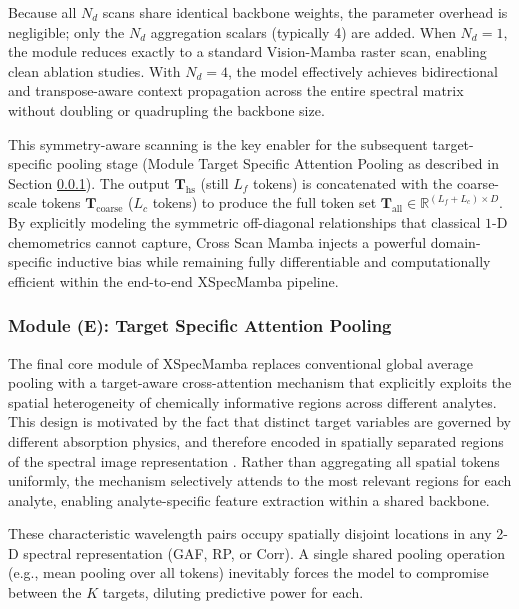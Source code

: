 \documentclass[pdflatex,sn-mathphys-num]{sn-jnl}%
\begin{document}
Because all $N_d$ scans share identical backbone weights, the parameter overhead is negligible; only the $N_d$ aggregation scalars (typically 4) are added. When $N_d = 1$, the module reduces exactly to a standard Vision-Mamba raster scan, enabling clean ablation studies. With $N_d = 4$, the model effectively achieves bidirectional and transpose-aware context propagation across the entire spectral matrix without doubling or quadrupling the backbone size.

This symmetry-aware scanning is the key enabler for the subsequent target-specific pooling stage (Module Target Specific Attention Pooling as described in Section \ref{sec:target-specific-attention-pooling}). The output $\mathbf{T}_\text{hs}$ (still $L_f$ tokens) is concatenated with the coarse-scale tokens $\mathbf{T}_\text{coarse}$ ($L_c$ tokens) to produce the full token set $\mathbf{T}_\text{all} \in \mathbb{R}^{(L_f + L_c) \times D}$. By explicitly modeling the symmetric off-diagonal relationships that classical $1$-D chemometrics cannot capture, Cross Scan Mamba injects a powerful domain-specific inductive bias while remaining fully differentiable and computationally efficient within the end-to-end XSpecMamba pipeline.

\subsubsection{Module (E): Target Specific Attention Pooling}\label{sec:target-specific-attention-pooling}
The final core module of XSpecMamba replaces conventional global average pooling with a target-aware cross-attention mechanism that explicitly exploits the spatial heterogeneity of chemically informative regions across different analytes. This design is motivated by the fact that distinct target variables are governed by different absorption physics, and therefore encoded in spatially separated regions of the spectral image representation \cite{weyer2002spectra}. Rather than aggregating all spatial tokens uniformly, the mechanism selectively attends to the most relevant regions for each analyte, enabling analyte-specific feature extraction within a shared backbone. 

These characteristic wavelength pairs occupy spatially disjoint locations in any 2-D spectral representation (GAF, RP, or Corr). A single shared pooling operation (e.g., mean pooling over all tokens) inevitably forces the model to compromise between the $K$ targets, diluting predictive power for each.
\end{document}
